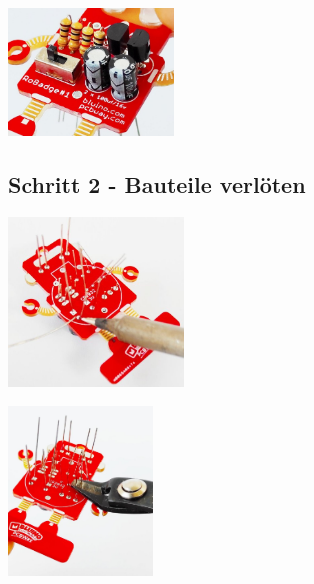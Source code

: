 \documentclass[a4paper]{article}
\begin{document}
\begin{minipage}[t]{\textwidth}
  \centering
  \includegraphics[width=0.33\textwidth]{../pictures/Bestueckung.jpg}
  \label{img:Bestueckung}
\end{minipage}
\subsection{Schritt 2 - Bauteile verlöten}
\begin{minipage}[t]{0.28\textwidth}
  \centering
  \includegraphics[height=4.5cm]{../pictures/Loeten.jpg}
  \label{img:Loeten}
  \end{minipage}
\begin{minipage}[t]{0.33\textwidth}
  \centering
  \includegraphics[height=4.5cm]{../pictures/Cut.jpg}
  \label{img:Cut}
\end{minipage}
\ \\
\end{document}
